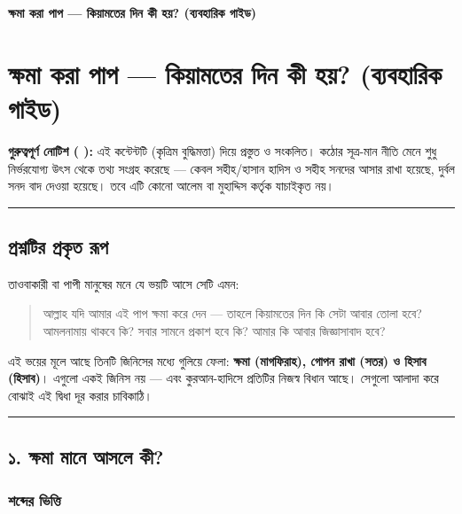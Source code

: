 

\begin{center}{\Large\bfseries\color{emerald} ক্ষমা করা পাপ — কিয়ামতের দিন কী হয়? (ব্যবহারিক গাইড)}\end{center}
\vspace{1em}
\section*{ক্ষমা করা পাপ — কিয়ামতের দিন কী হয়? (ব্যবহারিক গাইড)}

\begin{warnbox}
 \textbf{গুরুত্বপূর্ণ নোটিশ ( ):} এই কন্টেন্টটি  (কৃত্রিম বুদ্ধিমত্তা) দিয়ে প্রস্তুত ও সংকলিত।  কঠোর সূত্র-মান নীতি মেনে শুধু নির্ভরযোগ্য উৎস থেকে তথ্য সংগ্রহ করেছে — কেবল সহীহ/হাসান হাদিস ও সহীহ সনদের আসার রাখা হয়েছে, দুর্বল সনদ বাদ দেওয়া হয়েছে। তবে এটি কোনো আলেম বা মুহাদ্দিস কর্তৃক যাচাইকৃত নয়।
\end{warnbox}

\medskip\hrule\medskip

\subsection*{প্রশ্নটির প্রকৃত রূপ}

তাওবাকারী বা পাপী মানুষের মনে যে ভয়টি আসে সেটি এমন:

\begin{quote}
আল্লাহ যদি আমার এই পাপ ক্ষমা করে দেন — তাহলে কিয়ামতের দিন কি সেটা আবার তোলা হবে? আমলনামায় থাকবে কি? সবার সামনে প্রকাশ হবে কি? আমার কি আবার জিজ্ঞাসাবাদ হবে?
\end{quote}

এই ভয়ের মূলে আছে তিনটি জিনিসের মধ্যে গুলিয়ে ফেলা: \textbf{ক্ষমা (মাগফিরাহ), গোপন রাখা (সতর) ও হিসাব (হিসাব)}। এগুলো একই জিনিস নয় — এবং কুরআন-হাদিসে প্রতিটির নিজস্ব বিধান আছে। সেগুলো আলাদা করে বোঝাই এই দ্বিধা দূর করার চাবিকাঠি।

\medskip\hrule\medskip

\subsection*{১. ক্ষমা মানে আসলে কী?}

\subsubsection*{শব্দের ভিত্তি}

